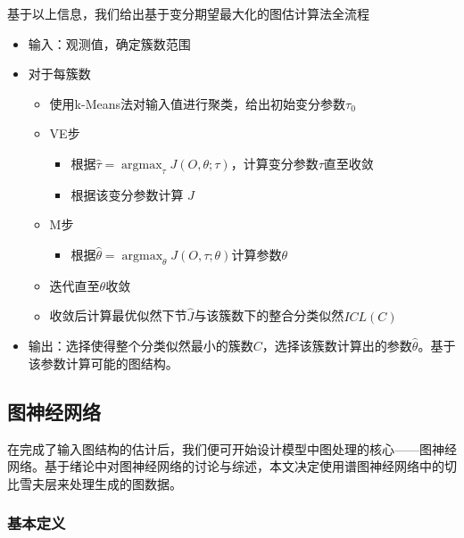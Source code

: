 \documentclass[
]{article}
\begin{document}
基于以上信息，我们给出基于变分期望最大化的图估计算法全流程

\begin{itemize}
\item
  输入：观测值，确定簇数范围
\item
  对于每簇数

  \begin{itemize}
  \item
    使用k-Means法对输入值进行聚类，给出初始变分参数\(\tau_0\)
  \item
    VE步

    \begin{itemize}
    \item
      根据\(\hat{\tau}=\mathop{\arg\max}_\tau J(O,\theta;\tau)\)，计算变分参数\(\tau\)直至收敛
    \item
      根据该变分参数计算 \(J\)
    \end{itemize}
  \item
    M步

    \begin{itemize}
    \item
      根据\(\hat{\theta}=\mathop{\arg\max}_\theta J(O,\tau;\theta)\)计算参数\(\theta\)
    \end{itemize}
  \item
    迭代直至\(\theta\)收敛
  \item
    收敛后计算最优似然下节\(\hat{J}\)与该簇数下的整合分类似然\(ICL(C)\)
  \end{itemize}
\item
  输出：选择使得整个分类似然最小的簇数\(C\)，选择该簇数计算出的参数\(\hat\theta\)。基于该参数计算可能的图结构。
\end{itemize}

\hypertarget{ux56feux795eux7ecfux7f51ux7edc-2}{%
\subsection{图神经网络}\label{ux56feux795eux7ecfux7f51ux7edc-2}}

在完成了输入图结构的估计后，我们便可开始设计模型中图处理的核心------图神经网络。基于绪论中对图神经网络的讨论与综述，本文决定使用谱图神经网络中的切比雪夫层来处理生成的图数据。

\hypertarget{ux57faux672cux5b9aux4e49}{%
\subsubsection{基本定义}\label{ux57faux672cux5b9aux4e49}}
\end{document}
